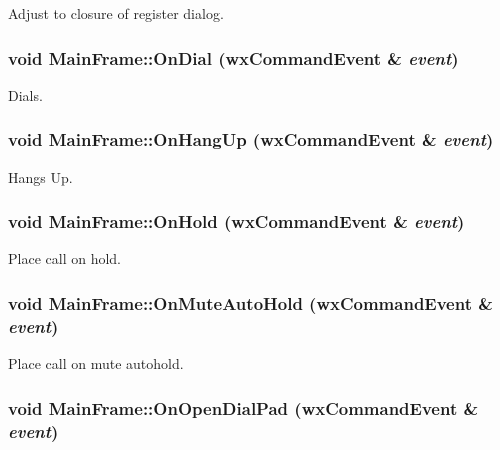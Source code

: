 Adjust to closure of register dialog. 

\hypertarget{classMainFrame_90d32f36e1682ed4f5d2c2612ce6e2e3}{
\subsubsection[{OnDial}]{\setlength{\rightskip}{0pt plus 5cm}void MainFrame::OnDial (wxCommandEvent \& {\em event})}}
\label{classMainFrame_90d32f36e1682ed4f5d2c2612ce6e2e3}


Dials. 

\hypertarget{classMainFrame_dbb9352129402cc4595446460c80d09f}{
\subsubsection[{OnHangUp}]{\setlength{\rightskip}{0pt plus 5cm}void MainFrame::OnHangUp (wxCommandEvent \& {\em event})}}
\label{classMainFrame_dbb9352129402cc4595446460c80d09f}


Hangs Up. 

\hypertarget{classMainFrame_343bfdcd2c0c3a32a58e11136408969b}{
\subsubsection[{OnHold}]{\setlength{\rightskip}{0pt plus 5cm}void MainFrame::OnHold (wxCommandEvent \& {\em event})}}
\label{classMainFrame_343bfdcd2c0c3a32a58e11136408969b}


Place call on hold. 

\hypertarget{classMainFrame_cc537fb606070bc855356caef79efde8}{
\subsubsection[{OnMuteAutoHold}]{\setlength{\rightskip}{0pt plus 5cm}void MainFrame::OnMuteAutoHold (wxCommandEvent \& {\em event})}}
\label{classMainFrame_cc537fb606070bc855356caef79efde8}


Place call on mute autohold. 

\hypertarget{classMainFrame_330d1881b7c14a2d29235f3f437b0456}{
\subsubsection[{OnOpenDialPad}]{\setlength{\rightskip}{0pt plus 5cm}void MainFrame::OnOpenDialPad (wxCommandEvent \& {\em event})}}
\label{classMainFrame_330d1881b7c14a2d29235f3f437b0456}


